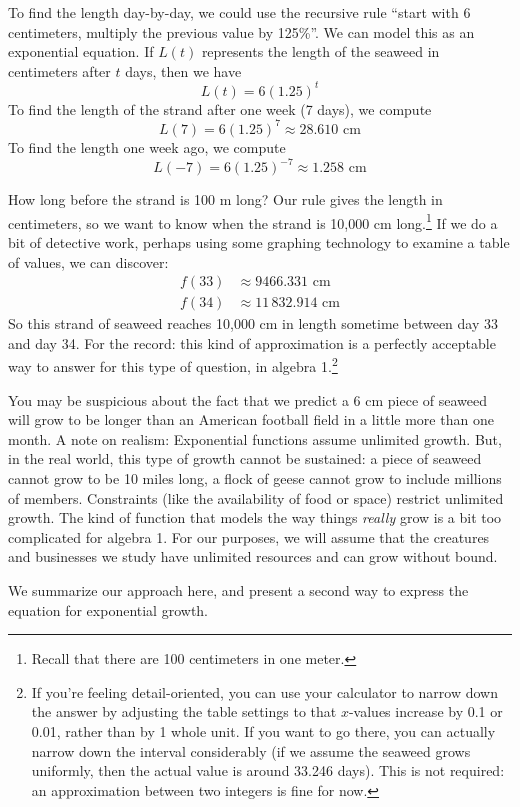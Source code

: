 To find the length day-by-day, we could use the recursive rule ``start with 6 centimeters, multiply the previous value by 125\%''. We can model this as an exponential equation. If $L(t)$ represents the length of the seaweed in centimeters after $t$ days, then we have \[L(t) = 6(1.25)^t\]
To find the length of the strand after one week (7 days), we compute \[L(7) = 6(1.25)^7 \approx 28.610 \text{ cm}\]
To find the length one week ago, we compute \[L(-7) = 6(1.25)^{-7} \approx 1.258 \text{ cm}\]

How long before the strand is 100 m long? Our rule gives the length in centimeters, so we want to know when the strand is 10,000 cm long.\footnote{Recall that there are 100 centimeters in one meter.} If we do a bit of detective work, perhaps using some graphing technology to examine a table of values, we can discover:
\[\begin{aligned}
f(33) &\approx 9466.331 \text{ cm}
\\
f(34) &\approx 11\,832.914 \text{ cm}
\end{aligned}\]
So this strand of seaweed reaches 10,000 cm in length sometime between day 33 and day 34. For the record: this kind of approximation is a perfectly acceptable way to answer for this type of question, in algebra 1.\footnote{If you're feeling detail-oriented, you can use your calculator to narrow down the answer by adjusting the table settings to that $x$-values increase by 0.1 or 0.01, rather than by 1 whole unit. If you want to go there, you can actually narrow down the interval considerably (if we assume the seaweed grows uniformly, then the actual value is around 33.246 days). This is not required: an approximation between two integers is fine for now.}

You may be suspicious about the fact that we predict a 6 cm piece of seaweed will grow to be longer than an American football field in a little more than one month. A note on realism: Exponential functions assume unlimited growth. But, in the real world, this type of growth cannot be sustained: a piece of seaweed cannot grow to be 10 miles long, a flock of geese cannot grow to include millions of members. Constraints (like the availability of food or space) restrict unlimited growth. The kind of function that models the way things \textit{really} grow is a bit too complicated for algebra 1. For our purposes, we will assume that the creatures and businesses we study have unlimited resources and can grow without bound.

We summarize our approach here, and present a second way to express the equation for exponential growth.

